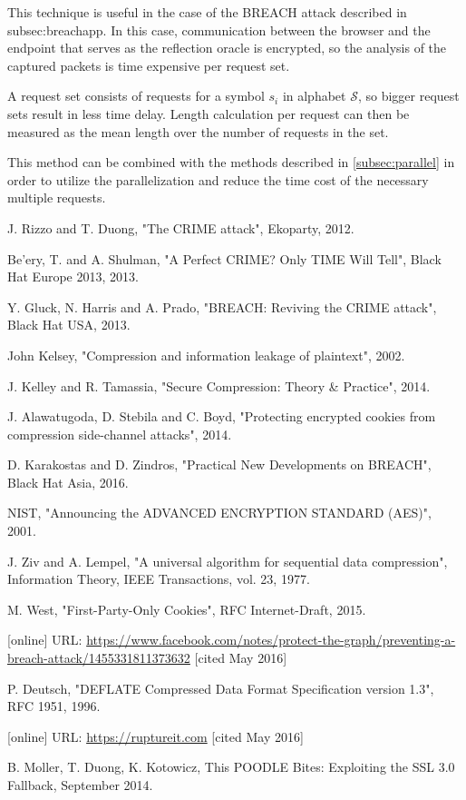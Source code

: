 \documentclass{sig-alternate-05-2015}
\begin{document}
This technique is useful in the case of the BREACH attack described in
{subsec:breachapp}. In this case, communication between the browser and the
endpoint that serves as the reflection oracle is encrypted, so the analysis of
the captured packets is time expensive per request set.

A request set consists of requests for a symbol $s_i$ in alphabet $\mathcal{S}$,
so bigger request sets result in less time delay. Length calculation per request
can then be measured as the mean length over the number of requests in the set.

This method can be combined with the methods described in \ref{subsec:parallel}
in order to utilize the parallelization and reduce the time cost of the
necessary multiple requests.

\begin{thebibliography}{13}

 J. Rizzo and T. Duong, "The CRIME attack", Ekoparty, 2012.

 Be'ery, T. and A. Shulman, "A Perfect CRIME? Only TIME Will Tell",
Black Hat Europe 2013, 2013.

 Y. Gluck, N. Harris and A. Prado, "BREACH: Reviving the CRIME attack",
Black Hat USA, 2013.

 John Kelsey, "Compression and information leakage of plaintext", 2002.

 J. Kelley and R. Tamassia, "Secure Compression: Theory \& Practice",
2014.

 J. Alawatugoda, D. Stebila and C. Boyd, "Protecting encrypted
cookies from compression side-channel attacks", 2014.

 D. Karakostas and D. Zindros, "Practical New Developments on
BREACH", Black Hat Asia, 2016.

 NIST, "Announcing the ADVANCED ENCRYPTION STANDARD (AES)", 2001.

 J. Ziv and A. Lempel, "A universal algorithm for sequential data
compression", Information Theory, IEEE Transactions, vol. 23, 1977.

 M. West, "First-Party-Only Cookies", RFC Internet-Draft, 2015.

 [online] URL:
\url{https://www.facebook.com/notes/protect-the-graph/preventing-a-breach-attack/1455331811373632}
[cited May 2016]

 P. Deutsch, "DEFLATE Compressed Data Format Specification version
1.3", RFC 1951, 1996.

 [online] URL: \url{https://ruptureit.com} [cited May 2016]

 B. Moller, T. Duong, K. Kotowicz, This POODLE Bites: Exploiting the SSL 3.0 Fallback, September 2014.

\end{thebibliography}
\end{document}
